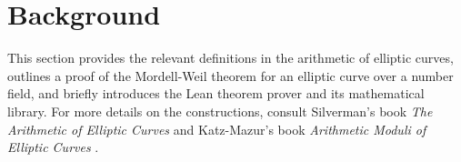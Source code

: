 \def\course{The Mordell-Weil theorem in Lean}
\def\subtitle{Spring 2022}



\newcommand{\Ab}{\textbf{Ab}}
\newcommand{\Alg}{\textbf{Alg}}
\newcommand{\Sch}{\textbf{Sch}}
\newcommand{\Set}{\textbf{Set}}


\def\lstlanguagefiles{lstlean.tex}
\lstset{language=lean}





\maketitle

\begin{abstract}
In 1922, Louis Mordell proved that the group of rational points of an elliptic curve is finitely generated. Subsequently, in 1928, Andr\'e Weil generalised this for abelian varieties over number fields, and their collective result has since been known as the Mordell-Weil theorem. This report documents an ongoing attempt to formalise relevant definitions and a proof of the Mordell-Weil theorem for an elliptic curve over a number field in the Lean theorem prover, along with any design decisions made in the process.
\end{abstract}

\tableofcontents

\pagebreak

\section{Background}

This section provides the relevant definitions in the arithmetic of elliptic curves, outlines a proof of the Mordell-Weil theorem for an elliptic curve over a number field, and briefly introduces the Lean theorem prover and its mathematical library. For more details on the constructions, consult Silverman's book \emph{The Arithmetic of Elliptic Curves} \cite{Sil09} and Katz-Mazur's book \emph{Arithmetic Moduli of Elliptic Curves} \cite{KM85}.


